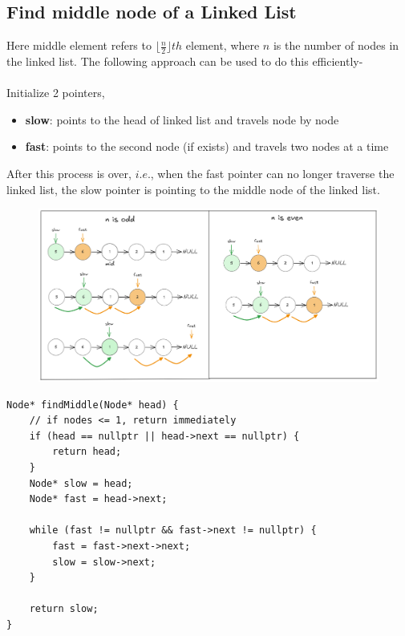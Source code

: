 \documentclass[a4paper, 12pt]{book}
\begin{document}
	\subsection{Find middle node of a Linked List}
		Here middle element refers to $\lfloor{\frac{n}{2}\rfloor}th$ element, where $n$ is the number of nodes in the linked list.
		The following approach can be used to do this efficiently- \\ \\
		Initialize 2 pointers, 
		\begin{itemize}
			\item \textbf{slow}: points to the head of linked list and travels node by node
			\item \textbf{fast}: points to the second node (if exists) and travels two nodes at a time
		\end{itemize}
		After this process is over, $i.e.$, when the fast pointer can no longer traverse the linked list, the slow pointer is pointing to the middle node of the linked list.
		
		\begin{figure}[h] 
			\centering
			\includegraphics[width=1.1\textwidth]{midnode.png}
			\label{fig:findmidnode}
		\end{figure}
		
		
		\begin{tcolorbox}[]
			\begin{verbatim}
Node* findMiddle(Node* head) {
	// if nodes <= 1, return immediately
	if (head == nullptr || head->next == nullptr) {
		return head;
	}
	Node* slow = head;
	Node* fast = head->next;
					
	while (fast != nullptr && fast->next != nullptr) {
		fast = fast->next->next;
		slow = slow->next; 
	}
					
	return slow;
}
			\end{verbatim}
		\end{tcolorbox}
		
\end{document}
